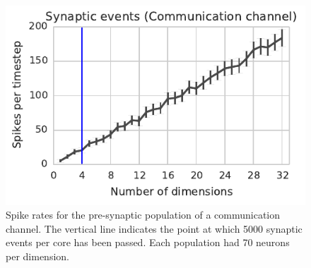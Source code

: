 \documentclass[conference]{IEEEtran}
\begin{document}
  \begin{figure}[!t]
    \centering
    \includegraphics[scale=0.8]{figures/network-1}
    \caption{Spike rates for the pre-synaptic population of a communication channel.  The vertical line indicates the point at which \num{5000} synaptic events per core has been passed. Each population had 70 neurons per dimension.}
    \label{fig:results/network-utilisation}
  \end{figure}
\end{document}
